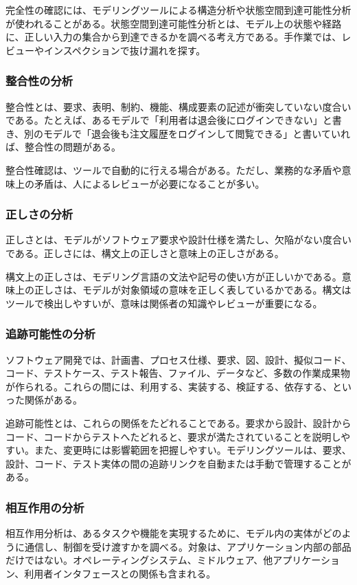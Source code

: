 \documentclass[a4paper,11pt]{ltjsarticle}
\numberwithin{figure}{section}
\numberwithin{table}{section}
\begin{document}
完全性の確認には、モデリングツールによる構造分析や状態空間到達可能性分析が使われることがある。状態空間到達可能性分析とは、モデル上の状態や経路に、正しい入力の集合から到達できるかを調べる考え方である。手作業では、レビューやインスペクションで抜け漏れを探す。

\subsubsection{整合性の分析}
整合性とは、要求、表明、制約、機能、構成要素の記述が衝突していない度合いである。たとえば、あるモデルで「利用者は退会後にログインできない」と書き、別のモデルで「退会後も注文履歴をログインして閲覧できる」と書いていれば、整合性の問題がある。

整合性確認は、ツールで自動的に行える場合がある。ただし、業務的な矛盾や意味上の矛盾は、人によるレビューが必要になることが多い。

\subsubsection{正しさの分析}
正しさとは、モデルがソフトウェア要求や設計仕様を満たし、欠陥がない度合いである。正しさには、構文上の正しさと意味上の正しさがある。

構文上の正しさは、モデリング言語の文法や記号の使い方が正しいかである。意味上の正しさは、モデルが対象領域の意味を正しく表しているかである。構文はツールで検出しやすいが、意味は関係者の知識やレビューが重要になる。

\subsubsection{追跡可能性の分析}
ソフトウェア開発では、計画書、プロセス仕様、要求、図、設計、擬似コード、コード、テストケース、テスト報告、ファイル、データなど、多数の作業成果物が作られる。これらの間には、利用する、実装する、検証する、依存する、といった関係がある。

追跡可能性とは、これらの関係をたどれることである。要求から設計、設計からコード、コードからテストへたどれると、要求が満たされていることを説明しやすい。また、変更時には影響範囲を把握しやすい。モデリングツールは、要求、設計、コード、テスト実体の間の追跡リンクを自動または手動で管理することがある。

\subsubsection{相互作用の分析}
相互作用分析は、あるタスクや機能を実現するために、モデル内の実体がどのように通信し、制御を受け渡すかを調べる。対象は、アプリケーション内部の部品だけではない。オペレーティングシステム、ミドルウェア、他アプリケーション、利用者インタフェースとの関係も含まれる。
\end{document}
